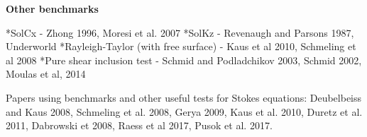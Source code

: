 \documentclass[a4paper,11pt]{article}
\begin{document}
\textbf{Other benchmarks}

*SolCx - Zhong 1996, Moresi et al. 2007
*SolKz - Revenaugh and Parsons 1987, Underworld
*Rayleigh-Taylor (with free surface) - Kaus et al 2010, Schmeling et al 2008
*Pure shear inclusion test - Schmid and Podladchikov 2003, Schmid 2002, Moulas et al, 2014

Papers using benchmarks and other useful tests for Stokes equations:
Deubelbeiss and Kaus 2008, Schmeling et al. 2008, Gerya 2009, Kaus et al. 2010, Duretz et al. 2011, Dabrowski et 2008, Raess et al 2017, Pusok et al. 2017.





\end{document}
